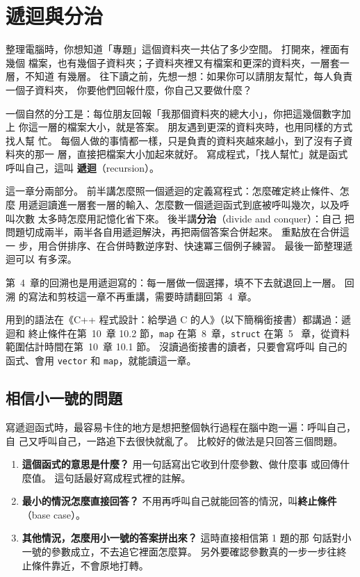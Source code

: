 \chapter{遞迴與分治}
\label{ch:recursion}

整理電腦時，你想知道「專題」這個資料夾一共佔了多少空間。 打開來，裡面有幾個
檔案，也有幾個子資料夾；子資料夾裡又有檔案和更深的資料夾，一層套一層，不知道
有幾層。 往下讀之前，先想一想：如果你可以請朋友幫忙，每人負責一個子資料夾，
你要他們回報什麼，你自己又要做什麼？

一個自然的分工是：每位朋友回報「我那個資料夾的總大小」，你把這幾個數字加上
你這一層的檔案大小，就是答案。 朋友遇到更深的資料夾時，也用同樣的方式找人幫
忙。 每個人做的事情都一樣，只是負責的資料夾越來越小，到了沒有子資料夾的那一
層，直接把檔案大小加起來就好。 寫成程式，「找人幫忙」就是函式呼叫自己，這叫
\textbf{遞迴}（recursion）。

這一章分兩部分。 前半講怎麼照一個遞迴的定義寫程式：怎麼確定終止條件、怎麼
用遞迴讀進一層套一層的輸入、怎麼數一個遞迴函式到底被呼叫幾次，以及呼叫次數
太多時怎麼用記憶化省下來。 後半講\textbf{分治}（divide and conquer）：自己
把問題切成兩半，兩半各自用遞迴解決，再把兩個答案合併起來。 重點放在合併這一
步，用合併排序、在合併時數逆序對、快速冪三個例子練習。 最後一節整理遞迴可以
有多深。

第~4~章的回溯也是用遞迴寫的：每一層做一個選擇，填不下去就退回上一層。 回溯
的寫法和剪枝這一章不再重講，需要時請翻回第~4~章。

用到的語法在《C++ 程式設計：給學過 C 的人》（以下簡稱銜接書）都講過：遞迴和
終止條件在第~10~章 10.2 節，\texttt{map} 在第~8~章，\texttt{struct} 在第~5~
章，從資料範圍估計時間在第~10~章 10.1 節。 沒讀過銜接書的讀者，只要會寫呼叫
自己的函式、會用 \texttt{vector} 和 \texttt{map}，就能讀這一章。

\section{相信小一號的問題}
\label{sec:rec-basics}

寫遞迴函式時，最容易卡住的地方是想把整個執行過程在腦中跑一遍：呼叫自己，自
己又呼叫自己，一路追下去很快就亂了。 比較好的做法是只回答三個問題。

\begin{enumerate}
\item \textbf{這個函式的意思是什麼？} 用一句話寫出它收到什麼參數、做什麼事
或回傳什麼值。 這句話最好寫成程式裡的註解。
\item \textbf{最小的情況怎麼直接回答？} 不用再呼叫自己就能回答的情況，叫\textbf{終止條件}（base case）。
\item \textbf{其他情況，怎麼用小一號的答案拼出來？} 這時直接相信第 1 題的那
句話對小一號的參數成立，不去追它裡面怎麼算。 另外要確認參數真的一步一步往終
止條件靠近，不會原地打轉。
\end{enumerate}

